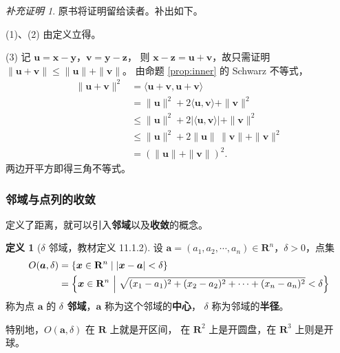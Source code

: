 \documentclass[11pt]{ctexart}
\theoremstyle{plain}
\theoremstyle{definition}
\newtheorem{defn}[thm]{定义}
\theoremstyle{remark}
\newtheorem*{completion}{补充证明}
\begin{document}
\begin{completion}
原书将证明留给读者。补出如下。

(1)、(2) 由定义立得。

(3) 记 \(\boldsymbol{u}=\boldsymbol{x}-\boldsymbol{y}\)，\(\boldsymbol{v}=\boldsymbol{y}-\boldsymbol{z}\)，
则 \(\boldsymbol{x}-\boldsymbol{z}=\boldsymbol{u}+\boldsymbol{v}\)，故只需证明
\(\|\boldsymbol{u}+\boldsymbol{v}\|\le\|\boldsymbol{u}\|+\|\boldsymbol{v}\|\)。
由命题 \ref{prop:inner} 的 Schwarz 不等式，
\begin{align*}
  \|\boldsymbol{u}+\boldsymbol{v}\|^2
  &=\langle \boldsymbol{u}+\boldsymbol{v},\boldsymbol{u}+\boldsymbol{v}\rangle\\
  &=\|\boldsymbol{u}\|^2+2\langle \boldsymbol{u},\boldsymbol{v}\rangle+\|\boldsymbol{v}\|^2\\
  &\le\|\boldsymbol{u}\|^2+2|\langle \boldsymbol{u},\boldsymbol{v}\rangle|+\|\boldsymbol{v}\|^2\\
  &\le\|\boldsymbol{u}\|^2+2\|\boldsymbol{u}\|\,\|\boldsymbol{v}\|+\|\boldsymbol{v}\|^2\\
  &=(\|\boldsymbol{u}\|+\|\boldsymbol{v}\|)^2 .
\end{align*}
两边开平方即得三角不等式。
\end{completion}

\subsubsection{邻域与点列的收敛}

定义了距离，就可以引入\textbf{邻域}以及\textbf{收敛}的概念。

\begin{defn}[\(\delta\) 邻域，教材定义 11.1.2]\label{def:nbhd}
设 \(\boldsymbol{a}=(a_1,a_2,\cdots,a_n)\in\mathbf{R}^n\)，\(\delta>0\)，点集
\begin{align*}
  O(\boldsymbol{a},\delta)
  &=\{\boldsymbol{x}\in\mathbf{R}^n\mid |\boldsymbol{x}-\boldsymbol{a}|<\delta\}\\
  &=\Bigl\{\boldsymbol{x}\in\mathbf{R}^n\ \Big|\
    \sqrt{(x_1-a_1)^2+(x_2-a_2)^2+\cdots+(x_n-a_n)^2}<\delta\Bigr\}
\end{align*}
称为点 \(\boldsymbol{a}\) 的 \textbf{\(\delta\) 邻域}，\(\boldsymbol{a}\) 称为这个邻域的\textbf{中心}，
\(\delta\) 称为邻域的\textbf{半径}。
\end{defn}

特别地，\(O(\boldsymbol{a},\delta)\) 在 \(\mathbf{R}\) 上就是开区间，
在 \(\mathbf{R}^2\) 上是开圆盘，在 \(\mathbf{R}^3\) 上则是开球。
\end{document}
